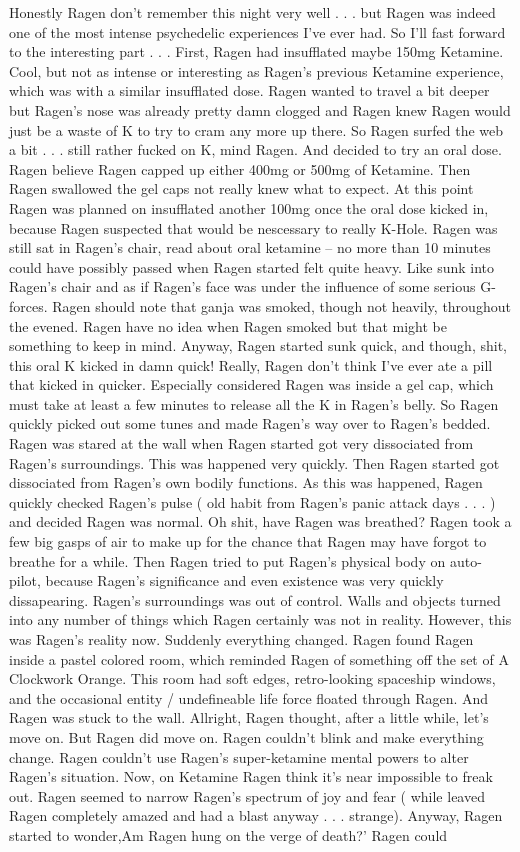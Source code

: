 \documentclass[12pt]{book}
\begin{document}
Honestly Ragen don't remember this night very well . . .  but Ragen was indeed one of the most intense psychedelic experiences I've ever had. So I'll fast forward to the interesting part . . .  First, Ragen had insufflated maybe 150mg Ketamine. Cool, but not as intense or interesting as Ragen's previous Ketamine experience, which was with a similar insufflated dose. Ragen wanted to travel a bit deeper but Ragen's nose was already pretty damn clogged and Ragen knew Ragen would just be a waste of K to try to cram any more up there. So Ragen surfed the web a bit . . .  still rather fucked on K, mind Ragen. And decided to try an oral dose. Ragen believe Ragen capped up either 400mg or 500mg of Ketamine. Then Ragen swallowed the gel caps not really knew what to expect. At this point Ragen was planned on insufflated another 100mg once the oral dose kicked in, because Ragen suspected that would be nescessary to really K-Hole. Ragen was still sat in Ragen's chair, read about oral ketamine -- no more than 10 minutes could have possibly passed when Ragen started felt quite heavy. Like sunk into Ragen's chair and as if Ragen's face was under the influence of some serious G-forces. Ragen should note that ganja was smoked, though not heavily, throughout the evened. Ragen have no idea when Ragen smoked but that might be something to keep in mind. Anyway, Ragen started sunk quick, and though, shit, this oral K kicked in damn quick! Really, Ragen don't think I've ever ate a pill that kicked in quicker. Especially considered Ragen was inside a gel cap, which must take at least a few minutes to release all the K in Ragen's belly. So Ragen quickly picked out some tunes and made Ragen's way over to Ragen's bedded. Ragen was stared at the wall when Ragen started got very dissociated from Ragen's surroundings. This was happened very quickly. Then Ragen started got dissociated from Ragen's own bodily functions. As this was happened, Ragen quickly checked Ragen's pulse ( old habit from Ragen's panic attack days . . .   ) and decided Ragen was normal. Oh shit, have Ragen was breathed? Ragen took a few big gasps of air to make up for the chance that Ragen may have forgot to breathe for a while. Then Ragen tried to put Ragen's physical body on auto-pilot, because Ragen's significance and even existence was very quickly dissapearing. Ragen's surroundings was out of control. Walls and objects turned into any number of things which Ragen certainly was not in reality. However, this was Ragen's reality now. Suddenly everything changed. Ragen found Ragen inside a pastel colored room, which reminded Ragen of something off the set of A Clockwork Orange. This room had soft edges, retro-looking spaceship windows, and the occasional entity / undefineable life force floated through Ragen. And Ragen was stuck to the wall. Allright, Ragen thought, after a little while, let's move on. But Ragen did move on. Ragen couldn't blink and make everything change. Ragen couldn't use Ragen's super-ketamine mental powers to alter Ragen's situation. Now, on Ketamine Ragen think it's near impossible to freak out. Ragen seemed to narrow Ragen's spectrum of joy and fear ( while leaved Ragen completely amazed and had a blast anyway . . .  strange). Anyway, Ragen started to wonder,Am Ragen hung on the verge of death?' Ragen could 
\end{document}
